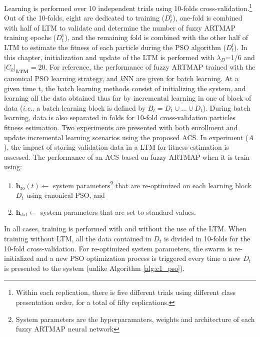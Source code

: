 Learning is performed over 10 independent trials using 10-folds cross-validation.\footnote{Within each replication, there is five different trials using different class presentation order, for a total of fifty replications.} Out of the 10-folds, eight are dedicated to training ($D_t^\text{t}$), one-fold is combined with half of LTM to validate and determine the number of fuzzy ARTMAP training epochs ($D_t^\text{v}$), and the remaining fold is combined with the other half of LTM to estimate the fitness of each particle during the PSO algorithm ($D_t^\text{f}$). In this chapter, initialization and update of the LTM is performed with $\lambda_D$=1/6 and $|C_k|_\mathbf{LTM}=20$. For reference, the performance of fuzzy ARTMAP trained with the canonical PSO learning strategy, and \textit{k}NN are given for batch learning. At a given time t, the batch learning methods consist of initializing the system, and learning all the data obtained thus far by incremental learning in one of block of data (\emph{i.e.}, a batch learning block is defined by $B_t = D_1\cup...\cup D_t$). During batch learning, data is also separated in folds for 10-fold cross-validation particles fitness estimation. Two experiments are presented with both enrollment and update incremental learning scenarios using the proposed ACS. In experiment ($A$), the impact of storing validation data in a LTM for fitness estimation is assessed. The performance of an ACS based on fuzzy ARTMAP when it is train using:
\begin{enumerate}
	\item $\textbf{h}_\text{ro}(t) \leftarrow$ system parameters\footnote{System
			  parameters are the hyperparamaters, weights and architecture of each
			  fuzzy ARTMAP neural network} that are re-optimized on each learning
			  block $D_t$ using canonical PSO, and
	\item $\textbf{h}_\text{std} \leftarrow$ system parameters that are set to
				standard values.
\end{enumerate}
In all cases, training is performed with and without the use of the LTM. When training without LTM, all the data contained in $D_t$ is divided in 10-folds for the 10-fold cross-validation. For re-optimized system parameters, the swarm is re-initialized and a new PSO optimization process is triggered every time a new $D_t$ is presented to the system (unlike Algorithm \ref{alg:c1_pso}).

